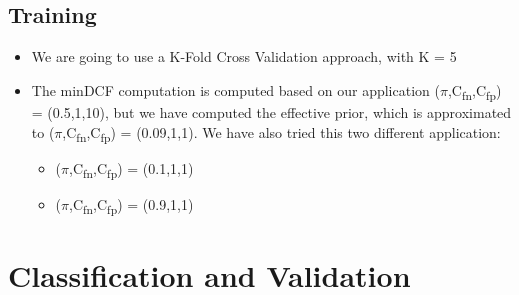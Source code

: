 \documentclass[english]{report}
\begin{document}
\section{Training}
    \begin{itemize}
        \item We are going to use a K-Fold Cross Validation approach, with K = 5
        \item The minDCF computation is computed based on our application ($\pi$,C\textsubscript{fn},C\textsubscript{fp}) = (0.5,1,10), but we have
        computed the effective prior, which is approximated to ($\pi$,C\textsubscript{fn},C\textsubscript{fp}) = (0.09,1,1).\newline
        We have also tried this two different application:
        \begin{itemize}
            \item ($\pi$,C\textsubscript{fn},C\textsubscript{fp}) = (0.1,1,1)
            \item ($\pi$,C\textsubscript{fn},C\textsubscript{fp}) = (0.9,1,1)
        \end{itemize}
    \end{itemize}

\chapter{Classification and Validation}
\end{document}
